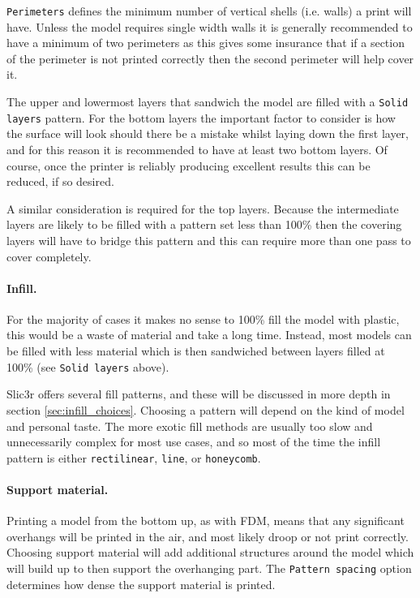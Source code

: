 \texttt{Perimeters} defines the minimum number of vertical shells (i.e. walls) a print will have.  Unless the model requires single width walls it is generally recommended to have a minimum of two perimeters as this gives some insurance that if a section of the perimeter is not printed correctly then the second perimeter will help cover it.

The upper and lowermost layers that sandwich the model are filled with a \texttt{Solid layers} pattern.  For the bottom layers the important factor to consider is how the surface will look should there be a mistake whilst laying down the first layer, and for this reason it is recommended to have at least two bottom layers.  Of course, once the printer is reliably producing excellent results this can be reduced, if so desired.

A similar consideration is required for the top layers.  Because the intermediate layers are likely to be filled with a pattern set less than 100\% then the covering layers will have to bridge this pattern and this can require more than one pass to cover completely.



\paragraph{Infill.} %
\label{par:simple_infill}
For the majority of cases it makes no sense to 100\% fill the model with plastic, this would be a waste of material and take a long time.  Instead, most models can be filled with less material which is then sandwiched between layers filled at 100\% (see \texttt{Solid layers} above).

Slic3r offers several fill patterns, and these will be discussed in more depth in section \ref{sec:infill_choices}.  Choosing a pattern will depend on the kind of model and personal taste.  The more exotic fill methods are usually too slow and unnecessarily complex for most use cases, and so most of the time the infill pattern is either \texttt{rectilinear}, \texttt{line}, or \texttt{honeycomb}.


\paragraph{Support material.} %
\label{par:simple_support_material}
Printing a model from the bottom up, as with FDM, means that any significant overhangs will be printed in the air, and most likely droop or not print correctly.  Choosing support material will add additional structures around the model which will build up to then support the overhanging part.  The \texttt{Pattern spacing} option determines how dense the support material is printed.

